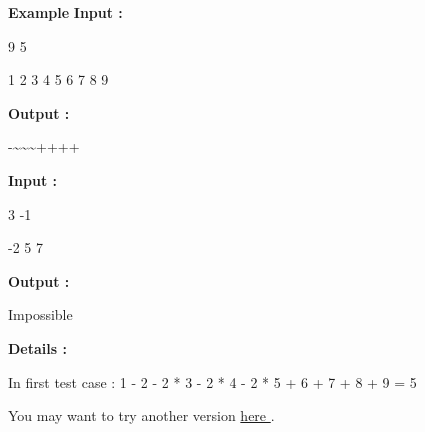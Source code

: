 \textbf{Example }
\textbf{Input : }


9 5

1 2 3 4 5 6 7 8 9

\textbf{Output : }


-\textasciitilde\textasciitilde\textasciitilde++++




\textbf{Input : }


3 -1

-2 5 7


\textbf{Output : }


Impossible




\textbf{Details : }


In first test case : 1 - 2 - 2 * 3 - 2 * 4 - 2 * 5 + 6 + 7 + 8 + 9 = 5

You may want to try another version \href{/problems/show/BLOPER}{ here } .